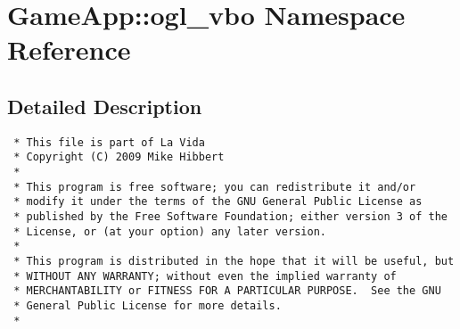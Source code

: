 \hypertarget{namespaceGameApp_1_1ogl__vbo}{
\section{GameApp::ogl\_\-vbo Namespace Reference}
\label{namespaceGameApp_1_1ogl__vbo}
}




\subsection{Detailed Description}


\footnotesize\begin{verbatim}
 * This file is part of La Vida
 * Copyright (C) 2009 Mike Hibbert
 *
 * This program is free software; you can redistribute it and/or
 * modify it under the terms of the GNU General Public License as
 * published by the Free Software Foundation; either version 3 of the
 * License, or (at your option) any later version.
 *
 * This program is distributed in the hope that it will be useful, but
 * WITHOUT ANY WARRANTY; without even the implied warranty of
 * MERCHANTABILITY or FITNESS FOR A PARTICULAR PURPOSE.  See the GNU
 * General Public License for more details.
 *
\end{verbatim}
\normalsize
 